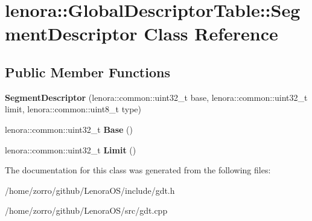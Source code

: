 \hypertarget{classlenora_1_1GlobalDescriptorTable_1_1SegmentDescriptor}{}\section{lenora\+:\+:Global\+Descriptor\+Table\+:\+:Segment\+Descriptor Class Reference}
\label{classlenora_1_1GlobalDescriptorTable_1_1SegmentDescriptor}
\subsection*{Public Member Functions}
\begin{DoxyCompactItemize}
\item 
\mbox{\label{classlenora_1_1GlobalDescriptorTable_1_1SegmentDescriptor_a42f4dce4bce5aaa4a70cb7748daaf2d8}} 
{\bfseries Segment\+Descriptor} (lenora\+::common\+::uint32\+\_\+t base, lenora\+::common\+::uint32\+\_\+t limit, lenora\+::common\+::uint8\+\_\+t type)
\item 
\mbox{\label{classlenora_1_1GlobalDescriptorTable_1_1SegmentDescriptor_aeb065fd3ef4a652e8fab35bd5b0b4a53}} 
lenora\+::common\+::uint32\+\_\+t {\bfseries Base} ()
\item 
\mbox{\label{classlenora_1_1GlobalDescriptorTable_1_1SegmentDescriptor_a35d53521838d776e8250bbb07e3f5be4}} 
lenora\+::common\+::uint32\+\_\+t {\bfseries Limit} ()
\end{DoxyCompactItemize}


The documentation for this class was generated from the following files\+:\begin{DoxyCompactItemize}
\item 
/home/zorro/github/\+Lenora\+O\+S/include/gdt.\+h\item 
/home/zorro/github/\+Lenora\+O\+S/src/gdt.\+cpp\end{DoxyCompactItemize}
